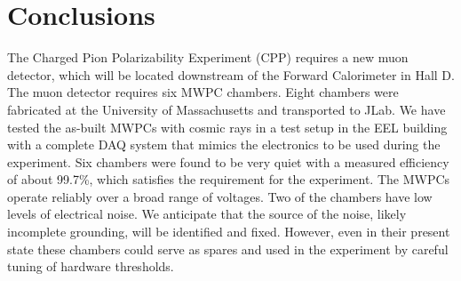 \documentclass[12pt]{article}
\begin{document}
\section{Conclusions} 
The Charged Pion Polarizability Experiment (CPP) requires a new muon detector, which will be located downstream of the Forward Calorimeter in Hall D. The muon detector requires six MWPC chambers. Eight chambers were fabricated at the University of Massachusetts and transported to JLab. We have tested the as-built MWPCs with cosmic rays in a test setup in the EEL building with a complete DAQ system that mimics the electronics to be used during the experiment. Six chambers were found to be very quiet with a measured efficiency of about 99.7\%, which satisfies the requirement for the experiment. The MWPCs operate reliably over a broad range of voltages. Two of the chambers have low levels of electrical noise. We anticipate that the source of the noise, likely incomplete grounding, will be identified and fixed. However, even in their present state  these chambers could serve as spares and used in the experiment by careful tuning of hardware thresholds.

                                                                              
       

\end{document}
